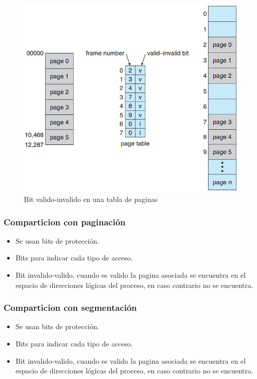 \documentclass{beamer}
\begin{document}
\begin{frame}
	\begin{figure}[H]
		\centering
		\includegraphics[scale=0.6]{img/paginacion_proteccion.png}
		\caption{Bit valido-invalido en una tabla de paginas}
	\end{figure}
\end{frame}


\begin{frame}
	\frametitle{Comparticion con paginación}
	
	\begin{itemize}
		\item Se usan bits de protección.
		\item Bits para indicar cada tipo de acceso.
		\item Bit invalido-valido, cuando es valido la pagina asociada se encuentra en el espacio de direcciones lógicas del proceso, en caso contrario no se encuentra.
	\end{itemize}
\end{frame}


\begin{frame}
	\frametitle{Comparticion con segmentación}
	
	\begin{itemize}
		\item Se usan bits de protección.
		\item Bits para indicar cada tipo de acceso.
		\item Bit invalido-valido, cuando es valido la pagina asociada se encuentra en el espacio de direcciones lógicas del proceso, en caso contrario no se encuentra.
	\end{itemize}
\end{frame}
\end{document}
